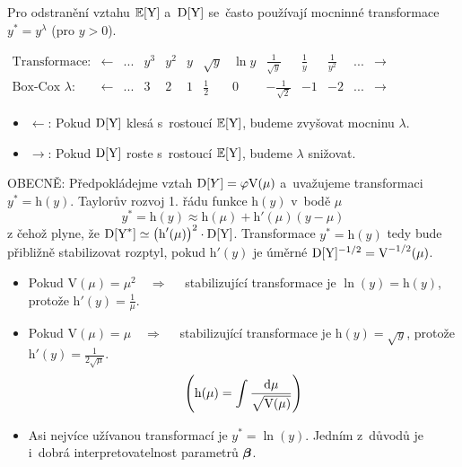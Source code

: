 \begin{enumerate}
Pro odstranění vztahu $\mathbb{E} [\text{Y}]$ a~$\mathrm{D}[\text{Y}]$ se~často používají mocninné transformace $y^* = y^{\lambda}$ (pro $y > 0$).

\begin{table}[h]
\centering
 $ \begin{array}{ *{13}{c} }
\text{Transformace:} & \leftarrow &... &  y^3 &  y^2 &  y & \sqrt{y}  & \ln y & \frac{1}{\sqrt{y}}  & \frac{1}{y} & \frac{1}{y^2} &...  & \rightarrow \\
\text{Box-Cox } \lambda : &\leftarrow  &... & 3 & 2 & 1 & \frac{1}{2}  & 0 &  -\frac{1}{\sqrt{2}} & -1 & -2 &... & \rightarrow
\end{array} $
\end{table}

\begin{itemize}
	\item $\leftarrow$: Pokud $\mathrm{D}[\text{Y}]$ klesá s~rostoucí $\mathbb{E}[\text{Y}]$, budeme zvyšovat mocninu $\lambda$.
	\item $\rightarrow$: Pokud $\mathrm{D}[\text{Y}]$ roste s~rostoucí $\mathbb{E}[\text{Y}]$, budeme $\lambda$ snižovat.
\end{itemize}

\end{enumerate}


OBECNĚ: Předpokládejme vztah $\mathrm{D}[Y] = \varphi \text{V}(\mu)$ a~uvažujeme transformaci $y^* = \text{h}(y)$. Taylorův rozvoj 1. řádu funkce $\text{h}(y)$ v~bodě $\mu$
 $$
 y^* = \text{h}(y) \approx \text{h}(\mu) + \text{h}'(\mu)(y-\mu)
 $$
z čehož plyne, že $\mathrm{D}[\text{Y}^*] \simeq \big(\text{h}'(\mu)\big)^2 \cdot \mathrm{D}[\text{Y}]$.
Transformace $y^* = \text{h}(y)$ tedy bude přibližně stabilizovat rozptyl, pokud $\text{h}'(y)$ je úměrné $\mathrm{D}[\text{Y}]^{-1/2} = \text{V}^{-1/2}(\mu)$.

\begin{itemize}
\item Pokud $\text{V}(\mu) = \mu^2 \quad \Rightarrow \quad$ stabilizující transformace je $\ln (y) = \text{h}(y)$, protože $\text{h}'(y) = \frac{1}{\mu}$.
\item Pokud $\text{V}(\mu) = \mu \quad \Rightarrow \quad$ stabilizující transformace je $\text{h}(y) = \sqrt{y}$, protože $\text{h}'(y) = \frac{1}{2 \sqrt{\mu}}$.
 $$
 \left(\text{h}(\mu) = \int \frac{\mathrm{d} \mu}{\sqrt{\text{V}(\mu)}} \right)
 $$
\item Asi nejvíce užívanou transformací je $y^* = \ln (y)$. Jedním z~důvodů je i~dobrá interpretovatelnost parametrů $\boldsymbol{\beta}$.
\end{itemize}


